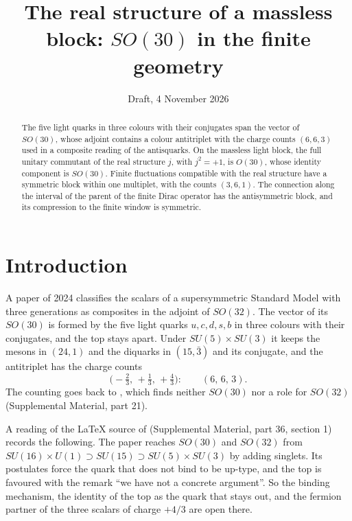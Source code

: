 \documentclass[aps,prd,reprint,onecolumn,nofootinbib,amsmath,amssymb,floatfix]{revtex4-2}
\theoremstyle{plain}
\newcommand{\supp}[1]{Supplemental Material, part #1}
\begin{document}
\title{The real structure of a massless block: $SO(30)$ in the finite geometry}
\date{Draft, 4 November 2026}

\begin{abstract}
The five light quarks in three colours with their conjugates span the vector of $SO(30)$, whose adjoint contains a colour antitriplet with the charge counts $(6,6,3)$ used in a composite reading of the antisquarks. On the massless light block, the full unitary commutant of the real structure $j$, with $j^2=+1$, is $O(30)$, whose identity component is $SO(30)$. Finite fluctuations compatible with the real structure have a symmetric block within one multiplet, with the counts $(3,6,1)$. The connection along the interval of the parent of the finite Dirac operator has the antisymmetric block, and its compression to the finite window is symmetric.
\end{abstract}

\maketitle

\section{Introduction}

A paper of 2024 \cite{Rivero2024} classifies the scalars of a supersymmetric Standard Model with three generations as composites in the adjoint of $SO(32)$. The vector of its $SO(30)$ is formed by the five light quarks $u,c,d,s,b$ in three colours with their conjugates, and the top stays apart. Under $SU(5)\times SU(3)$ it keeps the mesons in $(24,1)$ and the diquarks in $(15,\bar3)$ and its conjugate, and the antitriplet has the charge counts
\begin{equation}\label{eq:counts}
\bigl(-\tfrac23,\,+\tfrac13,\,+\tfrac43\bigr):\qquad(6,\,6,\,3).
\end{equation}
The counting goes back to \cite{Rivero2005}, which finds neither $SO(30)$ nor a role for $SO(32)$ (\supp{21}).

A reading of the LaTeX source of \cite{Rivero2024} (\supp{36}, section 1) records the following. The paper reaches $SO(30)$ and $SO(32)$ from $SU(16)\times U(1)\supset SU(15)\supset SU(5)\times SU(3)$ by adding singlets. Its postulates force the quark that does not bind to be up-type, and the top is favoured with the remark ``we have not a concrete argument''. So the binding mechanism, the identity of the top as the quark that stays out, and the fermion partner of the three scalars of charge $+4/3$ are open there.
\end{document}

